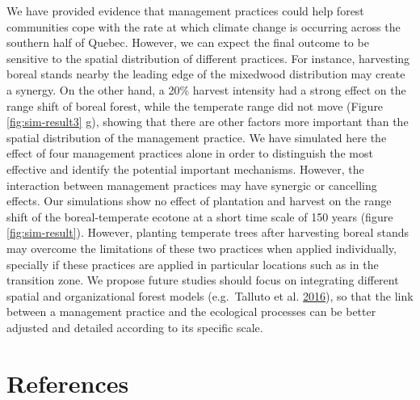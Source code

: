 \documentclass[12pt]{article}
\begin{document}
We have provided evidence that management practices could help forest
communities cope with the rate at which climate change is occurring
across the southern half of Quebec. However, we can expect the final
outcome to be sensitive to the spatial distribution of different
practices. For instance, harvesting boreal stands nearby the leading
edge of the mixedwood distribution may create a synergy. On the other
hand, a 20\% harvest intensity had a strong effect on the range shift of
boreal forest, while the temperate range did not move (Figure
\ref{fig:sim-result3} g), showing that there are other factors more
important than the spatial distribution of the management practice. We
have simulated here the effect of four management practices alone in
order to distinguish the most effective and identify the potential
important mechanisms. However, the interaction between management
practices may have synergic or cancelling effects. Our simulations show
no effect of plantation and harvest on the range shift of the
boreal-temperate ecotone at a short time scale of 150 years (figure
\ref{fig:sim-result}). However, planting temperate trees after
harvesting boreal stands may overcome the limitations of these two
practices when applied individually, specially if these practices are
applied in particular locations such as in the transition zone. We
propose future studies should focus on integrating different spatial and
organizational forest models (e.g.~Talluto et al.
\protect\hyperlink{ref-talluto2016}{2016}), so that the link between a
management practice and the ecological processes can be better adjusted
and detailed according to its specific scale.

\hypertarget{references}{%
\section*{References}\label{references}}
\end{document}
